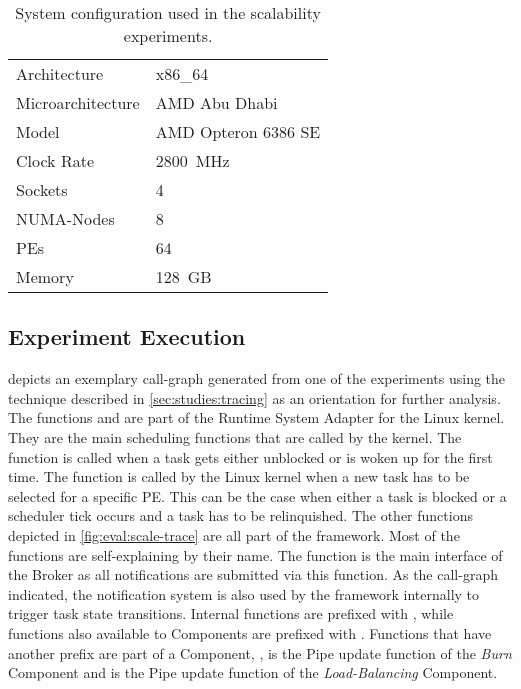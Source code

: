 \begin{table}[!t]
	\caption{System configuration used in the scalability experiments.}%
	\label{tbl:experiments:scale}
	\begin{tabular}{ll}\toprule
		Architecture      & x86\_64             \\
		Microarchitecture & AMD Abu Dhabi       \\
		Model             & AMD Opteron 6386 SE \\
		Clock Rate        & 2800~MHz            \\
		Sockets           & 4                   \\
		NUMA-Nodes        & 8                   \\
		\acp{PE}          & 64                  \\
		Memory            & 128~GB              \\ \bottomrule
	\end{tabular}
\end{table}

\subsection{Experiment Execution}

\begin{sidewaysfigure} \centering
	\caption[Exemplary call-graph of the scalability experiment.]{Exemplary call-graph of the scalability experiment. The call-graph was generated from the experiment with 16~\acp{PE} and the same number of scheduling Pipes.}%
	\label{fig:eval:scale-trace}
\end{sidewaysfigure}

 depicts an exemplary call-graph generated from one of the experiments using the technique described in \cref{sec:studies:tracing} as an orientation for further analysis. The functions  and  are part of the Runtime System Adapter for the Linux kernel. They are the main scheduling functions that are called by the kernel. The  function is called when a task gets either unblocked or is woken up for the first time. The  function is called by the Linux kernel when a new task has to be selected for a specific \ac{PE}. This can be the case when either a task is blocked or a scheduler tick occurs and a task has to be relinquished. The other functions depicted in \cref{fig:eval:scale-trace} are all part of the framework. Most of the functions are self-explaining by their name. The  function is the main interface of the \cobas{} Broker as all notifications are submitted via this function. As the call-graph indicated, the notification system is also used by the \cobas{} framework internally to trigger task state transitions. Internal functions are prefixed with , while functions also available to Components are prefixed with . Functions that have another prefix are part of a Component, \ie{},  is the Pipe update function of the \emph{Burn} Component and  is the Pipe update function of the \emph{Load-Balancing} Component.

